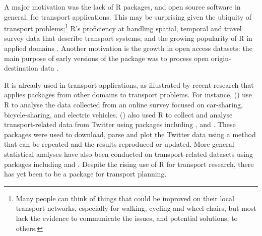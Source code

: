 
A major motivation was the lack of R packages, and open source software in general, for transport applications.
This may be surprising given the ubiquity of transport problems;\footnote{
Many people can think of things that could be improved on their local transport networks, especially for walking, cycling and wheel-chairs,
  but most lack the evidence to communicate the issues, and potential solutions, to others.
  }
R's proficiency at handling spatial, temporal and travel survey data that describe transport systems;
and the growing popularity of R in applied domains \citep{jalal_overview_2017,moore_why_2017}.
Another motivation is the growth in open access datasets:
the main purpose of early versions of the package was to process open origin-destination data \citep{lovelace_propensity_2017}.

%

R is already used in transport applications, as illustrated by recent
research that applies packages from other domains to transport problems.
For instance, \citeauthor{efthymiou_use_2012}
(\citeyear{efthymiou_use_2012}) use R to analyse the data collected from
an online survey focused on car-sharing, bicycle-sharing, and electric
vehicles. \citeauthor{efthymiou_use_2012}
(\citeyear{efthymiou_use_2012}) also used R to collect and analyse
transport-related data from Twitter using packages including
,  and . These packages
were used to download, parse and plot the Twitter data using a method
that can be repeated and the results reproduced or updated. More general
statistical analyses have also been conducted on transport-related
datasets using packages including  and 
\citep{diana_studying_2012,cerin_walking_2013}. Despite the rising use
of R for transport research, there has yet been to be a package for
transport planning.

